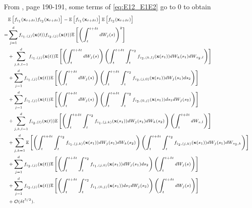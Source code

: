 %
From \cite{kloeden1992numerical}, page 190-191, some terms of \eqref{eq:E12_E1E2} go to 0 to obtain
%
\begin{equation}
\scriptsize
\begin{aligned}
&\mathbb{E} \left[ f_{i_1}(\mathbf{x}_{t + \delta t}) f_{i_2}(\mathbf{x}_{t + \delta t}) \right] 
- \mathbb{E} \left[ f_{i_1}(\mathbf{x}_{t + \delta t}) \right] \mathbb{E} \left[ f_{i_2}(\mathbf{x}_{t + \delta t}) \right] \\
=& 
 \sum_{j=1}^d f_{{i_1},(j)}(\mathbf{x}(t)) f_{{i_2},(j)}(\mathbf{x}(t)) \mathbb{E} \left[ \left( \int_t^{t + \delta t} dW_j(s) \right)^2 \right] \\
&+ \sum_{j,k,l=1}^d f_{{i_1},(j)}(\mathbf{x}(t)) \mathbb{E} \left[ \left( \int_t^{t + \delta t} dW_j(s) \right) \left( \int_t^{t+\delta t} \int_t^{s_2} f_{{i_2},(k,l)}(\mathbf{x}(s_1)) dW_k(s_1) dW_{s_2, l} \right) \right] \\
&+ \sum_{j=1}^d f_{{i_1},(j)}(\mathbf{x}(t)) \mathbb{E} \left[ \left( \int_t^{t + \delta t} dW_j(s) \right)\left( \int_t^{t+\delta t} \int_t^{s_2} f_{{i_2},(j,0)}(\mathbf{x}(s_1)) dW_j(s_1) ds_2 \right) \right]\\
&+ \sum_{j=1}^d f_{{i_1},(j)}(\mathbf{x}(t)) \mathbb{E} \left[ \left( \int_t^{t + \delta t} dW_j(s) \right) \left( \int_t^{t+\delta t} \int_t^{s_2} f_{{i_2},(0,j)}(\mathbf{x}(s_1)) ds_1 dW_j(s_2) \right) \right] \\
&+  \sum_{j, k, l=1}^d  f_{{i_2},(l)}(\mathbf{x}(t))\mathbb{E} \left[ \left( \int_t^{t+\delta t} \int_t^{s_2} f_{{i_1},(j,k)}(\mathbf{x}(s_1)) dW_j(s_1) dW_k(s_2) \right) \left( \int_t^{t + \delta t} dW_{s,l} \right) \right] \\
&+ \sum_{j, k=1}^d \mathbb{E} \left[ \left( \int_t^{t+\delta t} \int_t^{s_2} f_{{i_1},(j,k)}(\mathbf{x}(s_1)) dW_j(s_1) dW_k(s_2) \right) \left( \int_t^{t+\delta t} \int_t^{s_2} f_{{i_2},(j,k)}(\mathbf{x}(s_1)) dW_j(s_1) dW_{s_2,k} \right) \right] \\
&+  \sum_{j=1}^d f_{{i_2},(j)}(\mathbf{x}(t)) \mathbb{E} \left[ \left( \int_t^{t+\delta t} \int_t^{s_2} f_{{i_1},(j,0)}(\mathbf{x}(s_1)) dW_j(s_1) ds_2  \right) \left( \int_t^{t + \delta t} dW_j(s) \right) \right]\\
&+   \sum_{j=1}^d  f_{{i_2},(j)}(\mathbf{x}(t)) \mathbb{E} \left[ \left( \int_t^{t+\delta t} \int_t^{s_2} f_{{i_1},(0,j)}(\mathbf{x}(s_1)) ds_1 dW_j(s_2)  \right) \left(\int_t^{t + \delta t} dW_j(s) \right) \right] \\
&+ \mathcal{O} (\delta t^{5/2}) .
\end{aligned}
\end{equation}
